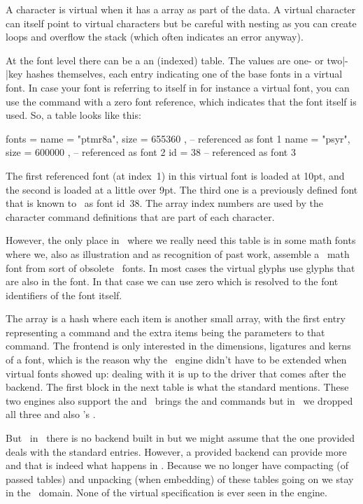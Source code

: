 A character is virtual when it has a  array as part of the data.
A virtual character can itself point to virtual characters but be careful with
nesting as you can create loops and overflow the stack (which often indicates an
error anyway).

At the font level there can be a an (indexed)  table. The values are
one- or two|-|key hashes themselves, each entry indicating one of the base fonts
in a virtual font. In case your font is referring to itself in for instance a
virtual font, you can use the  command with a zero font reference,
which indicates that the font itself is used. So, a table looks like this:

\starttyping
fonts = {
  { name = "ptmr8a", size = 655360 }, -- referenced as font 1
  { name = "psyr", size = 600000 },   -- referenced as font 2
  { id = 38 }                         -- referenced as font 3
}
\stoptyping

The first referenced font (at index~1) in this virtual font is 
loaded at 10pt, and the second is  loaded at a little over 9pt. The
third one is a previously defined font that is known to \LUAMETATEX\ as font
id~38. The array index numbers are used by the character command definitions that
are part of each character.

However, the only place in \CONTEXT\ where we really need this 
table is in some math fonts where we, also as illustration and as recognition of
past work, assemble a \UNICODE\ math font from sort of obsolete \TYPEONE\ fonts.
In most cases the virtual glyphs use glyphs that are also in the font. In that
case we can use  zero which is resolved to the font identifiers of the
font itself.

The  array is a hash where each item is another small array, with
the first entry representing a command and the extra items being the parameters
to that command. The frontend is only interested in the dimensions, ligatures and
kerns of a font, which is the reason why the \TEX\ engine didn't have to be
extended when virtual fonts showed up: dealing with it is up to the driver that
comes after the backend. The first block in the next table is what the standard
mentions. These two engines also support the  and \LUATEX\ brings
the  and  commands but in \LUAMETATEX\ we dropped all
three and also \LUATEX's .

But \unknown\ in \LUAMETATEX\ there is no backend built in but we might assume
that the one provided deals with the standard entries. However, a provided
backend can provide more and that is indeed what happens in \CONTEXT. Because we
no longer have compacting (of passed tables) and unpacking (when embedding) of
these tables going on we stay in the \LUA\ domain. None of the virtual
specification is ever seen in the engine.

